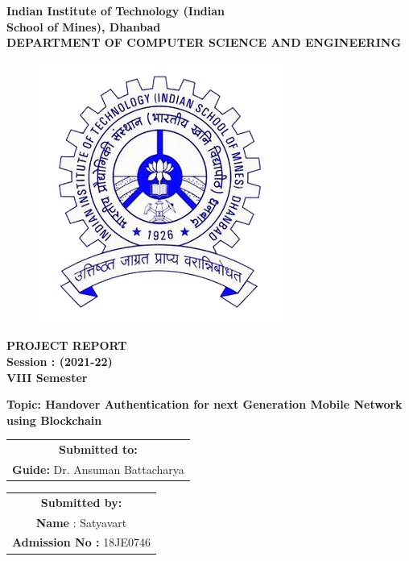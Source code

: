 

\begin{titlepage}
    \centering
    \LARGE \textbf  {Indian Institute of Technology (Indian\\ School of Mines), Dhanbad\\}
    \vspace{0.5em}
    \normalsize \textbf {DEPARTMENT OF COMPUTER SCIENCE AND ENGINEERING}
    
    \vspace{0.5em}
    \begin{figure}[h]
        \centering
        \includegraphics[scale=0.8]{img/logo.png}
    \end{figure}

    
    \centering
    {\LARGE \textbf {PROJECT REPORT\\[0.5\baselineskip]}}
    {\Large \textbf {Session : (2021-22)\\VIII Semester}}
    
    \vspace{1cm}
    {\large \textbf {Topic: Handover Authentication for next Generation Mobile Network using Blockchain}}\par

    \vspace{1cm}
    \begin{tabular}[t]{c}
        {\large \textbf {Submitted to: }}\\[1\baselineskip]{\textbf{Guide:} Dr. Ansuman Battacharya}
        
    \end{tabular}
    \hfill%
    \begin{tabular}[t]{c}
        {\large \textbf {Submitted by: }}\\[1\baselineskip]{\textbf{Name} : Satyavart}\\{\textbf{Admission No :} 18JE0746}
    \end{tabular}%

    

\end{titlepage}